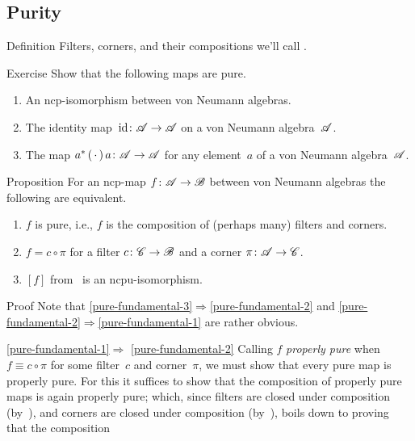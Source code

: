 \documentclass[a]{subfiles}
\begin{document}
\subsection{Purity}
\begin{parsec}%
\begin{point}{Definition}%
Filters, corners,
and their compositions we'll call .
\end{point}
\begin{point}{Exercise}%
Show that the following maps are pure.
\begin{enumerate}%
\item
An ncp-isomorphism between von Neumann algebras.
\item
The identity map~$\operatorname{id}\colon \mathscr{A}\to\mathscr{A}$
on a von Neumann algebra~$\mathscr{A}$.
\item
The map $a^*\,(\,\cdot\,)\,a\colon \mathscr{A}\to\mathscr{A}$
for any element~$a$ of a von Neumann algebra~$\mathscr{A}$.
\end{enumerate}
\end{point}
\begin{point}{Proposition}%
For an ncp-map $f\colon \mathscr{A}\to\mathscr{B}$ between von Neumann algebras
the following are equivalent.
\begin{enumerate}
\item 
\label{pure-fundamental-1}
	$f$ is pure, i.e., $f$ is the composition
	of (perhaps many) filters and corners.
\item
\label{pure-fundamental-2}
	$f = c\circ \pi$ for a filter $c\colon \mathscr{C}\to\mathscr{B}$
	and a corner $\pi\colon \mathscr{A}\to\mathscr{C}$.
\item
\label{pure-fundamental-3}
	$[f]$ from~ is an ncpu-isomorphism.
\end{enumerate}
\begin{point}{Proof}%
Note that \ref{pure-fundamental-3}$\Longrightarrow$\ref{pure-fundamental-2}
and \ref{pure-fundamental-2}$\Longrightarrow$\ref{pure-fundamental-1}
are rather obvious.
\begin{point}{\ref{pure-fundamental-1}$\Longrightarrow$%
\ref{pure-fundamental-2}}%
Calling $f$ \emph{properly pure}
when~$f\equiv c\circ \pi$
for some filter~$c$ and corner~$\pi$,
we must show that every pure map is properly pure.
For this it suffices to show that the composition of properly
pure maps is again properly pure;
which,
since filters are closed under composition
(by~),
and corners are closed under composition
(by~),
boils down to proving that the composition

\end{point}
\end{point}
\end{point}
\end{parsec}
\end{document}

